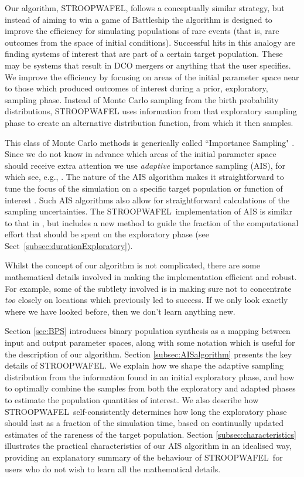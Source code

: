 \documentclass[a4paper,fleqn,usenatbib,useAMS,usedcolumn]{mnras}
\newcommand{\AISs}{\textsc{STROOPWAFEL}}
\begin{document}
Our algorithm, \AISs, follows a conceptually similar strategy, but instead of aiming to win a game of Battleship the algorithm is designed to improve the efficiency for simulating populations of rare events (that is, rare outcomes from the space of initial conditions).  Successful hits in this analogy are finding systems of interest that are part of a certain target population. These may be systems that result in DCO mergers or anything that the user specifies. We improve the efficiency by focusing on areas of the initial parameter space near to those which produced outcomes of interest during a prior, exploratory, sampling phase.   Instead of Monte Carlo sampling from the birth probability distributions, \AISs{} uses information from that exploratory sampling phase to create an alternative distribution function, from which it then samples.

This class of Monte Carlo methods is generically called ``Importance Sampling" \citep{kahn1951estimation, 10.2307/166789}.  Since we do not know in advance which areas of the initial parameter space should receive extra attention we use \emph{adaptive} importance sampling (AIS), for which see, e.g., \citet{torrie1977nonphysical, doi:10.1080/00401706.1995.10484303, ortiz2000adaptive, pennanen2006adaptive, cappe2004population, cornuet2012adaptive}.  
The nature of the AIS algorithm makes it straightforward to tune the focus of the simulation on a specific target population or function of interest  \citep{2007arXiv0710.4242C}.
Such AIS algorithms also allow for straightforward calculations of the sampling uncertainties. 
 The \AISs \ implementation of AIS is similar to that in \citet{cornuet2012adaptive}, but includes a new method to guide the fraction of the computational effort that should be spent on the exploratory phase (see Sect~\ref{subsec:durationExploratory}). 

Whilst the concept of our algorithm is not complicated, there are some mathematical details involved in making the implementation efficient and robust.  For example, some of the subtlety involved 
is in making sure not to concentrate \emph{too} closely on locations which previously led to success. If we only look exactly where we have looked before, then we don't learn anything new.

Section \ref{sec:BPS} introduces binary population synthesis as a mapping between input and output parameter spaces, along with some notation which is useful for the description of our algorithm.  Section \ref{subsec:AISalgorithm} presents the key details of  \AISs .  We explain how we shape the adaptive sampling distribution from the information found in an initial exploratory phase, and how to optimally combine the samples from both the exploratory and adapted phases to estimate the population quantities of interest. We also describe how \AISs \ self-consistently determines how long the exploratory phase should last as a fraction of the simulation time, based on continually updated estimates of the rareness of the target population.
Section \ref{subsec:characteristics} illustrates the practical characteristics of our AIS algorithm in an idealised way, providing an explanatory summary of the behaviour of \AISs \ for users who do not wish to learn all the mathematical details. 
\end{document}
